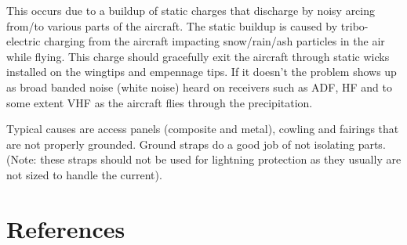\documentclass[
]{book}
\begin{document}
This occurs due to a buildup of static charges that discharge by noisy arcing
from/to various parts of the aircraft. The static buildup is caused by
tribo-electric charging from the aircraft impacting snow/rain/ash particles in
the air while flying. This charge should gracefully exit the aircraft through
static wicks installed on the wingtips and empennage tips. If it doesn't the
problem shows up as broad banded noise (white noise) heard on receivers such as
ADF, HF and to some extent VHF as the aircraft flies through the precipitation.

Typical causes are access panels (composite and metal), cowling and fairings
that are not properly grounded. Ground straps do a good job of not isolating
parts. (Note: these straps should not be used for lightning protection as they
usually are not sized to handle the current).

\hypertarget{references-12}{%
\section{References}\label{references-12}}
\end{document}
